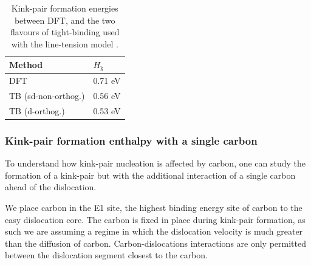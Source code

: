 \documentclass[a4paper,11pt]{article}
\begin{document}
\begin{table}[htbp]
\caption{Kink-pair formation energies between DFT, and the two flavours of tight-binding used with the line-tension model \label{kink-pair_formation_enthalpy_pure}.}
\centering
\begin{tabular}{ll}
Method & \(H_{\text{k}}\)\\
\hline
DFT & 0.71 eV\\
TB (sd-non-orthog.) & 0.56 eV\\
TB (d-orthog.) & 0.53 eV\\
\end{tabular}
\end{table}


\subsubsection{Kink-pair formation enthalpy with a single carbon}
\label{sec:orge1294fd}

To understand how kink-pair nucleation is affected by carbon, one
can study the formation of a kink-pair but with the
additional interaction of a single carbon ahead of the dislocation.

We place carbon in the E1 site, the highest binding energy site of carbon to
the easy dislocation core. The carbon is fixed in place during kink-pair
formation, as such we are assuming a regime in which the dislocation
velocity is much greater than the diffusion of carbon. Carbon-dislocations
interactions are only permitted between the dislocation segment closest to
the carbon.
\end{document}
